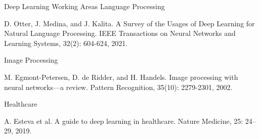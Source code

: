\begin{frame}[t]{Deep Learning Working Areas}
Language Processing
\begin{thebibliography}{1}
 \small{D. Otter, J. Medina, and J. Kalita. A Survey of the Usages of Deep Learning for Natural Language Processing. IEEE Transactions on Neural Networks and Learning Systems, 32(2): 604-624, 2021.}
\end{thebibliography}
\vspace{0.5cm}

Image Processing
\begin{thebibliography}{2}
 \small{M. Egmont-Petersen, D. de Ridder, and H. Handels. Image processing with neural networks—a review. Pattern Recognition, 35(10): 2279-2301, 2002.}
\end{thebibliography}
\vspace{0.5cm}

Healthcare
\begin{thebibliography}{3}
 \small{A. Esteva et al. A guide to deep learning in healthcare. Nature Medicine, 25: 24–29, 2019.}
\end{thebibliography}
\end{frame}


%
%
%
%	


